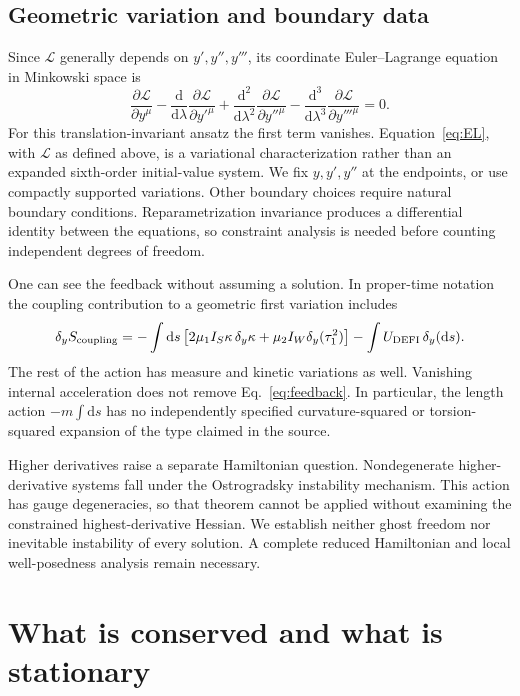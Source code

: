 \documentclass[aip,jmp,reprint,onecolumn,amsmath,amssymb]{revtex4-2}
\newcommand{\dd}{\mathrm{d}}
\newcommand{\U}{U_{\mathrm{DEFI}}}
\begin{document}
\subsection{Geometric variation and boundary data}
Since $\mathcal L$ generally depends on $y',y'',y'''$, its coordinate Euler--Lagrange equation in Minkowski space is
\begin{equation}
 \frac{\partial\mathcal L}{\partial y^\mu}
 -\frac{\dd}{\dd\lambda}\frac{\partial\mathcal L}{\partial y'^\mu}
 +\frac{\dd^2}{\dd\lambda^2}\frac{\partial\mathcal L}{\partial y''^\mu}
 -\frac{\dd^3}{\dd\lambda^3}\frac{\partial\mathcal L}{\partial y'''^\mu}=0.
 \label{eq:EL}
\end{equation}
For this translation-invariant ansatz the first term vanishes. Equation~\eqref{eq:EL}, with $\mathcal L$ as defined above, is a variational characterization rather than an expanded sixth-order initial-value system. We fix $y,y',y''$ at the endpoints, or use compactly supported variations. Other boundary choices require natural boundary conditions. Reparametrization invariance produces a differential identity between the equations, so constraint analysis is needed before counting independent degrees of freedom.

One can see the feedback without assuming a solution. In proper-time notation the coupling contribution to a geometric first variation includes
\begin{equation}
 \delta_y S_{\rm coupling}
 =-\int\dd s\left[2\mu_1 I_S\kappa\,\delta_y\kappa
       +\mu_2 I_W\delta_y(\tau_1^2)\right]
   -\int \U\,\delta_y(\dd s).
 \label{eq:feedback}
\end{equation}
The rest of the action has measure and kinetic variations as well. Vanishing internal acceleration does not remove Eq.~\eqref{eq:feedback}. In particular, the length action $-m\int\dd s$ has no independently specified curvature-squared or torsion-squared expansion of the type claimed in the source.

Higher derivatives raise a separate Hamiltonian question. Nondegenerate higher-derivative systems fall under the Ostrogradsky instability mechanism.\cite{woodard} This action has gauge degeneracies, so that theorem cannot be applied without examining the constrained highest-derivative Hessian. We establish neither ghost freedom nor inevitable instability of every solution. A complete reduced Hamiltonian and local well-posedness analysis remain necessary.

\section{What is conserved and what is stationary}
\end{document}
